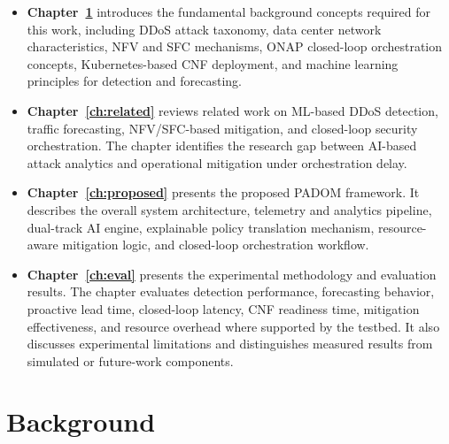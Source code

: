 \documentclass[12pt, a4paper, reqno, oneside]{book}
\newcommand{\padonap}{\textsc{PADOM}}
\begin{document}
\begin{itemize}
    \item \textbf{Chapter~\ref{ch:background}} introduces the fundamental
    background concepts required for this work, including DDoS attack taxonomy,
    data center network characteristics, NFV and SFC mechanisms, ONAP
    closed-loop orchestration concepts, Kubernetes-based CNF deployment, and
    machine learning principles for detection and forecasting.

    \item \textbf{Chapter~\ref{ch:related}} reviews related work on ML-based
    DDoS detection, traffic forecasting, NFV/SFC-based mitigation, and
    closed-loop security orchestration. The chapter identifies the research gap
    between AI-based attack analytics and operational mitigation under
    orchestration delay.

    \item \textbf{Chapter~\ref{ch:proposed}} presents the proposed \padonap{}
    framework. It describes the overall system architecture, telemetry and
    analytics pipeline, dual-track AI engine, explainable policy translation
    mechanism, resource-aware mitigation logic, and closed-loop orchestration
    workflow.

    \item \textbf{Chapter~\ref{ch:eval}} presents the experimental methodology
    and evaluation results. The chapter evaluates detection performance,
    forecasting behavior, proactive lead time, closed-loop latency, CNF readiness
    time, mitigation effectiveness, and resource overhead where supported by the
    testbed. It also discusses experimental limitations and distinguishes
    measured results from simulated or future-work components.
\end{itemize}

\chapter{Background}
\label{ch:background}
\end{document}
